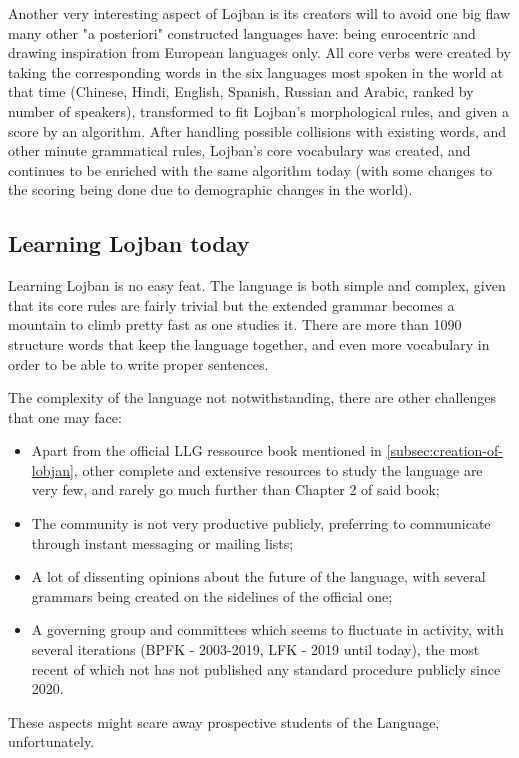 Another very interesting aspect of Lojban is its creators will to avoid one big flaw many other "a posteriori" constructed languages have: being
eurocentric and drawing inspiration from European languages only. All core verbs were created by taking the corresponding words in the six languages most spoken
in the world at that time (Chinese, Hindi, English, Spanish, Russian and Arabic, ranked by number of speakers), transformed to fit Lojban's morphological rules,
and given a score by an algorithm. After handling possible collisions with existing words, and other minute grammatical rules, Lojban's core vocabulary
was created, and continues to be enriched with the same algorithm today (with some changes to the scoring being done due to demographic changes in the world).

\subsection{Learning Lojban today}
\label{subsec:learning-lojban}

Learning Lojban is no easy feat. The language is both simple and complex, given that its core rules are fairly trivial but the extended grammar becomes a
mountain to climb pretty fast as one studies it. There are more than 1090 structure words that keep the language together, and even more vocabulary in order
to be able to write proper sentences.\newline

The complexity of the language not notwithstanding, there are other challenges that one may face:

\begin{itemize}
    \item Apart from the official LLG ressource book mentioned in \ref{subsec:creation-of-lobjan}, other complete and extensive resources to study the language
    are very few, and rarely go much further than Chapter 2 of said book;
    \item The community is not very productive publicly, preferring to communicate through instant messaging or mailing lists;
    \item A lot of dissenting opinions about the future of the language, with several grammars being created on the sidelines of the official one;
    \item A governing group and committees which seems to fluctuate in activity, with several iterations (BPFK - 2003-2019, LFK - 2019 until today),
    the most recent of which not has not published any standard procedure publicly since 2020.
\end{itemize}

These aspects might scare away prospective students of the Language, unfortunately.